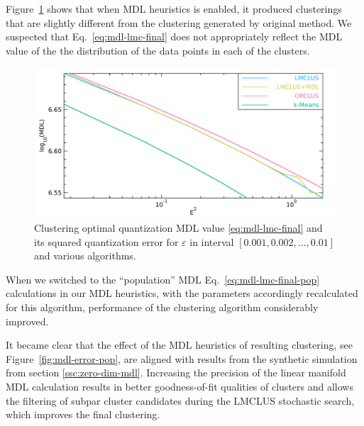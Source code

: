 Figure~\ref{fig:mdl-error} shows that when MDL heuristics is enabled, it
produced clusterings that are slightly different from the clustering generated
by original method. We suspected that Eq.~\eqref{eq:mdl-lmc-final} does not
appropriately reflect the MDL value of the the distribution of the data points
in each of the clusters.

\begin{figure}[ht]
\centering
\includegraphics[scale=\IfClass{IEEEtran}{0.3}{0.5}]{img/toterrs2-mdl-oq.pdf}
\caption{Clustering optimal quantization MDL value \eqref{eq:mdl-lmc-final} and its squared quantization error for $\varepsilon$ in interval $\left[0.001, 0.002, \dots, 0.01 \right]$ and various algorithms.}
\label{fig:mdl-error}
\end{figure}

When we switched to the ``population'' MDL Eq.~\eqref{eq:mdl-lmc-final-pop}
calculations in our MDL heuristics, with the parameters accordingly recalculated
for this algorithm, performance of the clustering algorithm considerably improved.

It became clear that the effect of the MDL heuristics of resulting clustering,
see Figure~\ref{fig:mdl-error-pop}, are aligned with results from the synthetic
simulation from section \ref{ssc:zero-dim-mdl}. Increasing the precision of
the linear manifold MDL calculation results in better goodness-of-fit qualities
of clusters and allows the filtering of subpar cluster candidates during
the LMCLUS stochastic search, which improves the final clustering.

